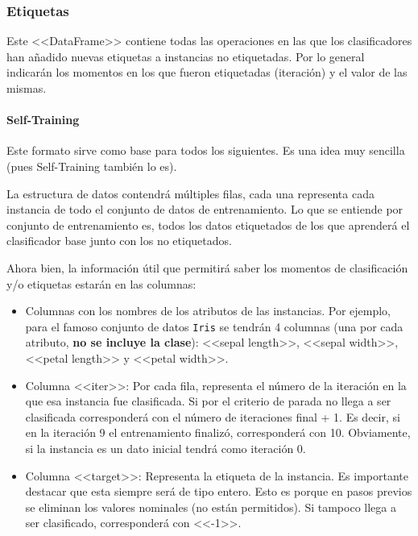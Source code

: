 \subsubsection{Etiquetas}
Este <<DataFrame>> contiene todas las operaciones en las que los clasificadores
han añadido nuevas etiquetas a instancias no etiquetadas. Por lo general
indicarán los momentos en los que fueron etiquetadas (iteración) y el valor de
las mismas.

\paragraph{Self-Training}
Este formato sirve como base para todos los siguientes. Es una idea muy sencilla
(pues Self-Training también lo es). 

La estructura de datos contendrá múltiples filas, cada una representa cada
instancia de todo el conjunto de datos de entrenamiento. Lo que se entiende por
conjunto de entrenamiento es, todos los datos etiquetados de los que aprenderá
el clasificador base junto con los no etiquetados.

Ahora bien, la información útil que permitirá saber los momentos de
clasificación y/o etiquetas estarán en las columnas:

\begin{itemize}
    \item Columnas con los nombres de los atributos de las instancias. Por
    ejemplo, para el famoso conjunto de datos \texttt{Iris} se tendrán 4
    columnas (una por cada atributo, \textbf{no se incluye la clase}): <<sepal
    length>>, <<sepal width>>, <<petal length>> y <<petal width>>.
    \item Columna <<iter>>: Por cada fila, representa el número de la iteración
    en la que esa instancia fue clasificada. Si por el criterio de parada no
    llega a ser clasificada corresponderá con el número de iteraciones final +
    1. Es decir, si en la iteración 9 el entrenamiento finalizó, corresponderá
    con 10. Obviamente, si la instancia es un dato inicial tendrá como iteración
    0.
    \item Columna <<target>>: Representa la etiqueta de la instancia. Es
    importante destacar que esta siempre será de tipo entero. Esto es porque en
    pasos previos se eliminan los valores nominales (no están permitidos). Si
    tampoco llega a ser clasificado, corresponderá con <<-1>>.
\end{itemize}


